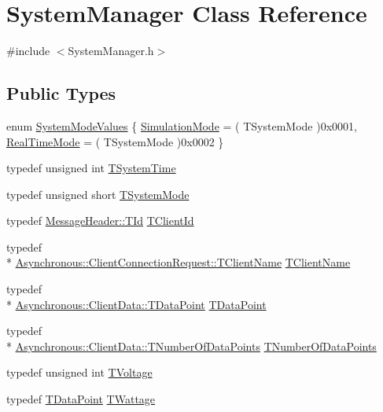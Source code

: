 \hypertarget{class_system_manager}{\section{System\-Manager Class Reference}
\label{class_system_manager}
}


{\ttfamily \#include $<$System\-Manager.\-h$>$}

\subsection*{Public Types}
\begin{DoxyCompactItemize}
\item 
enum \hyperlink{class_system_manager_a073873362e7861f8a0368bb62144d4ca}{System\-Mode\-Values} \{ \hyperlink{class_system_manager_a073873362e7861f8a0368bb62144d4caa55cdecfd6754c9496bbe9560aa6f181e}{Simulation\-Mode} = ( T\-System\-Mode )0x0001, 
\hyperlink{class_system_manager_a073873362e7861f8a0368bb62144d4caac1092623b7154136da8721ebf7402357}{Real\-Time\-Mode} = ( T\-System\-Mode )0x0002
 \}
\item 
typedef unsigned int \hyperlink{class_system_manager_a9743ff4f23e7d957f5932780d8070099}{T\-System\-Time}
\item 
typedef unsigned short \hyperlink{class_system_manager_aa32b3f50b8882c8aa7a9ca88ab7a43dd}{T\-System\-Mode}
\item 
typedef \hyperlink{class_terra_swarm_1_1_message_header_ab55de822fadad758edcd8f36bd07676e}{Message\-Header\-::\-T\-Id} \hyperlink{class_system_manager_af957fc0ff78c4c38085c26ac0d81064e}{T\-Client\-Id}
\item 
typedef \\*
\hyperlink{class_terra_swarm_1_1_asynchronous_1_1_client_connection_request_a50a16fcfef8eb10d5191b6eaf0723a92}{Asynchronous\-::\-Client\-Connection\-Request\-::\-T\-Client\-Name} \hyperlink{class_system_manager_a2d2818eaeb5787ef4f4d009ff343d195}{T\-Client\-Name}
\item 
typedef \\*
\hyperlink{class_terra_swarm_1_1_asynchronous_1_1_client_data_ac733720fed15e940f991de44f1bb514e}{Asynchronous\-::\-Client\-Data\-::\-T\-Data\-Point} \hyperlink{class_system_manager_a177b09f79bd2cef44160fb4d8ea77996}{T\-Data\-Point}
\item 
typedef \\*
\hyperlink{class_terra_swarm_1_1_asynchronous_1_1_client_data_a690994afd0ba9b8eeb56ae679a5c64e8}{Asynchronous\-::\-Client\-Data\-::\-T\-Number\-Of\-Data\-Points} \hyperlink{class_system_manager_a9cb6753ad6cd26b6ad46c194f38bee77}{T\-Number\-Of\-Data\-Points}
\item 
typedef unsigned int \hyperlink{class_system_manager_ad7c10914fe99b3f09350a10028f25300}{T\-Voltage}
\item 
typedef \hyperlink{class_system_manager_a177b09f79bd2cef44160fb4d8ea77996}{T\-Data\-Point} \hyperlink{class_system_manager_a924f6502f78c31bbf5f462f9554d4fc5}{T\-Wattage}
\end{DoxyCompactItemize}
